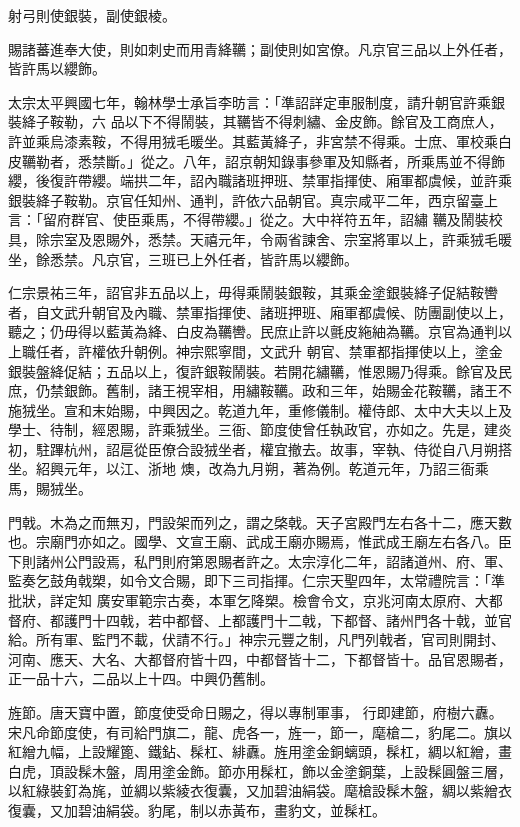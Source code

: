 \begin{pinyinscope}
 射弓則使銀裝，副使銀棱。



 賜諸蕃進奉大使，則如刺史而用青絳韉；副使則如宮僚。凡京官三品以上外任者，皆許馬以纓飾。



 太宗太平興國七年，翰林學士承旨李昉言：「準詔詳定車服制度，請升朝官許乘銀裝絳子鞍勒，六
 品以下不得鬧裝，其韉皆不得刺繡、金皮飾。餘官及工商庶人，許並乘烏漆素鞍，不得用狨毛暖坐。其藍黃絳子，非宮禁不得乘。士庶、軍校乘白皮韉勒者，悉禁斷。」從之。八年，詔京朝知錄事參軍及知縣者，所乘馬並不得飾纓，後復許帶纓。端拱二年，詔內職諸班押班、禁軍指揮使、廂軍都虞候，並許乘銀裝絳子鞍勒。京官任知州、通判，許依六品朝官。真宗咸平二年，西京留臺上言：「留府群官、使臣乘馬，不得帶纓。」從之。大中祥符五年，詔繡
 韉及鬧裝校具，除宗室及恩賜外，悉禁。天禧元年，令兩省諫舍、宗室將軍以上，許乘狨毛暖坐，餘悉禁。凡京官，三班已上外任者，皆許馬以纓飾。



 仁宗景祐三年，詔官非五品以上，毋得乘鬧裝銀鞍，其乘金塗銀裝絳子促結鞍轡者，自文武升朝官及內職、禁軍指揮使、諸班押班、廂軍都虞候、防團副使以上，聽之；仍毋得以藍黃為絳、白皮為韉轡。民庶止許以氈皮絁紬為韉。京官為通判以上職任者，許權依升朝例。神宗熙寧間，文武升
 朝官、禁軍都指揮使以上，塗金銀裝盤絳促結；五品以上，復許銀鞍鬧裝。若開花繡韉，惟恩賜乃得乘。餘官及民庶，仍禁銀飾。舊制，諸王視宰相，用繡鞍韉。政和三年，始賜金花鞍韉，諸王不施狨坐。宣和末始賜，中興因之。乾道九年，重修儀制。權侍郎、太中大夫以上及學士、待制，經恩賜，許乘狨坐。三衙、節度使曾任執政官，亦如之。先是，建炎初，駐蹕杭州，詔扈從臣僚合設狨坐者，權宜撤去。故事，宰執、侍從自八月朔搭坐。紹興元年，以江、浙地
 燠，改為九月朔，著為例。乾道元年，乃詔三衙乘馬，賜狨坐。



 門戟。木為之而無刃，門設架而列之，謂之棨戟。天子宮殿門左右各十二，應天數也。宗廟門亦如之。國學、文宣王廟、武成王廟亦賜焉，惟武成王廟左右各八。臣下則諸州公門設焉，私門則府第恩賜者許之。太宗淳化二年，詔諸道州、府、軍、監奏乞鼓角戟槊，如令文合賜，即下三司指揮。仁宗天聖四年，太常禮院言：「準批狀，詳定知
 廣安軍範宗古奏，本軍乞降槊。檢會令文，京兆河南太原府、大都督府、都護門十四戟，若中都督、上都護門十二戟，下都督、諸州門各十戟，並官給。所有軍、監門不載，伏請不行。」神宗元豐之制，凡門列戟者，官司則開封、河南、應天、大名、大都督府皆十四，中都督皆十二，下都督皆十。品官恩賜者，正一品十六，二品以上十四。中興仍舊制。



 旌節。唐天寶中置，節度使受命日賜之，得以專制軍事，
 行即建節，府樹六纛。宋凡命節度使，有司給門旗二，龍、虎各一，旌一，節一，麾槍二，豹尾二。旗以紅繒九幅，上設耀篦、鐵鉆、髹杠、緋纛。旌用塗金銅螭頭，髹杠，綢以紅繒，畫白虎，頂設髹木盤，周用塗金飾。節亦用髹杠，飾以金塗銅葉，上設髹圓盤三層，以紅綠裝釘為旄，並綢以紫綾衣復囊，又加碧油絹袋。麾槍設髹木盤，綢以紫繒衣復囊，又加碧油絹袋。豹尾，制以赤黃布，畫豹文，並髹杠。




\end{pinyinscope}
